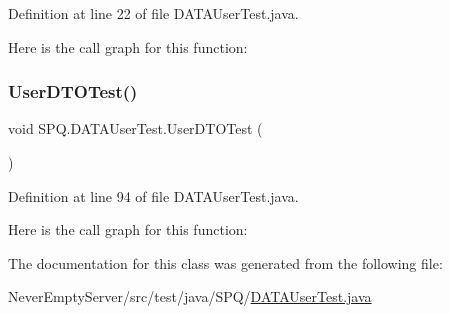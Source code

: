 Definition at line 22 of file D\+A\+T\+A\+User\+Test.\+java.

Here is the call graph for this function\+:
\mbox{\label{class_s_p_q_1_1_d_a_t_a_user_test_a4feb113d2b2971c37851e1b6bddca741}} 
\subsubsection{\texorpdfstring{User\+D\+T\+O\+Test()}{UserDTOTest()}}
{\footnotesize\ttfamily void S\+P\+Q.\+D\+A\+T\+A\+User\+Test.\+User\+D\+T\+O\+Test (\begin{DoxyParamCaption}{ }\end{DoxyParamCaption})}



Definition at line 94 of file D\+A\+T\+A\+User\+Test.\+java.

Here is the call graph for this function\+:


The documentation for this class was generated from the following file\+:\begin{DoxyCompactItemize}
\item 
Never\+Empty\+Server/src/test/java/\+S\+P\+Q/\mbox{\hyperlink{_d_a_t_a_user_test_8java}{D\+A\+T\+A\+User\+Test.\+java}}\end{DoxyCompactItemize}
